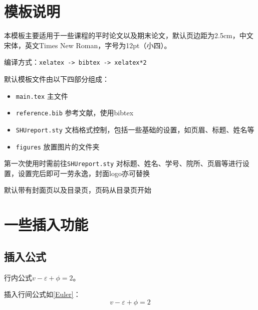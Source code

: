 \documentclass[12pt,hyperref,a4paper,UTF8]{ctexart}
\begin{document}
\cover

%
%

\thispagestyle{empty} %

\newpage
\tableofcontents

\newpage


\section{模板说明}
本模板主要适用于一些课程的平时论文以及期末论文，默认页边距为2.5cm，中文宋体，英文Times New Roman，字号为12pt（小四）。

编译方式：\verb|xelatex -> bibtex -> xelatex*2|


默认模板文件由以下四部分组成：
\begin{itemize}
    \item \texttt{main.tex} 主文件
    \item \texttt{reference.bib} 参考文献，使用bibtex
    \item \texttt{SHUreport.sty} 文档格式控制，包括一些基础的设置，如页眉、标题、姓名等
    \item \texttt{figures} 放置图片的文件夹
\end{itemize}

第一次使用时需前往\texttt{SHUreport.sty} 对标题、姓名、学号、院所、页眉等进行设置，设置完后即可一劳永逸，封面logo亦可替换

默认带有封面页以及目录页，页码从目录页开始

\section{一些插入功能}
\subsection{插入公式}
行内公式$v-\varepsilon+\phi=2$。

插入行间公式如\autoref{Euler}：
\begin{equation}
    v-\varepsilon+\phi=2
    \label{Euler}
\end{equation}
\end{document}
